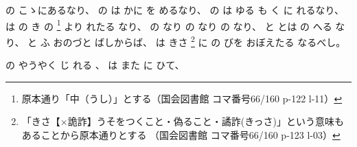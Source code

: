 %
の
こゝにあるなり、%
%
の
%
は
かに
を
めるなり、%
%
の
は
ゆる
も
く
に
れるなり、
%
は
の
き%
の
\footnote{原本通り「中（うし）」とする（国会図書館 コマ番号66/160 p-122 l-11）}%
より
れたる
なり、
%
の
なり
の
なり
の
なり、
%
と
とは
の
へる
なり、
%
と
ふ
おのづと
ばしからば、
%
は
きさ%
\footnote{「きさ【×詭詐】うそをつくこと・偽ること・譎詐(きっさ)」という意味もあることから原本通りとする
（国会図書館 コマ番号66/160 p-123 l-03）}%
に%
の
びを
おぼえたる
なるべし。

%
の
やうやく
じ
れる
、
%
は
また
に
ひて、

